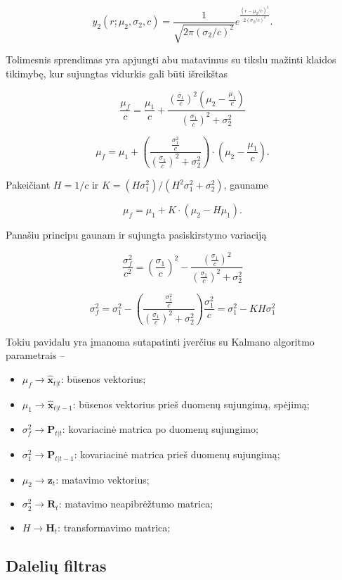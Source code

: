     \begin{equation}
        y_2(r; \mu_2, \sigma_2, c) = \frac{1}{\sqrt{2\pi (\sigma_2/c)^2}} e^{\frac{(r-\mu_2/c)^2}{2 (\sigma_2/c)^2}}.
    \end{equation}

    Tolimesnis sprendimas yra apjungti abu matavimus su tikslu mažinti klaidos tikimybę, kur sujungtas vidurkis gali būti išreikštas
    
    \begin{equation}
        \frac{\mu_f}{c} = \frac{\mu_1}{c} + \frac{ (\frac{\sigma_1}{c})^2 (\mu_2 - \frac{\mu_1}{c}) }{(\frac{\sigma_1}{c})^2 + \sigma_2^2}
    \end{equation}

    \begin{equation}
        \mu_f = \mu_1 + \left( \frac{ \frac{\sigma_1^2}{c} }{ ( \frac{\sigma_1}{c} )^2 + \sigma_2^2 } \right) \cdot 
        \left( \mu_2 - \frac{\mu_1}{c} \right).
    \end{equation}
    
    Pakeičiant $H = 1/c$ ir $K = ( H\sigma_1^2 )/(H^2\sigma_1^2 + \sigma_2^2)$, gauname

    \begin{equation}
        \mu_f = \mu_1 + K \cdot (\mu_2 - H\mu_1).
    \end{equation}

    Panašiu principu gaunam ir sujungta pasiskirstymo variaciją

    \begin{equation}
        \frac{\sigma_f^2}{c^2} = \left(\frac{\sigma_1}{c}\right)^2 - \frac{\left(\frac{\sigma_1}{c}\right)^2}{ \left( \frac{\sigma_1}{c} \right)^2 + \sigma_2^2 }
    \end{equation}
    
    \begin{equation}
        \sigma_f^2 = \sigma_1^2 - \left( \frac{ \frac{\sigma_1^2}{c} }{ \left( \frac{\sigma_1}{c} \right)^2 + \sigma_2^2 }  \right) \frac{\sigma_1^2}{c} = \sigma_1^2 - KH\sigma_1^2
    \end{equation}

    Tokiu pavidalu yra įmanoma sutapatinti įverčius su Kalmano algoritmo parametrais -- 
    \begin{itemize}
        \item $\mu_f \rightarrow \hat{\mathbf{x}}_{t|t}$: būsenos vektorius;
        \item $\mu_1 \rightarrow \hat{\mathbf{x}}_{t|t-1}$: būsenos vektorius prieš duomenų sujungimą, spėjimą;
        \item $\sigma_f^2 \rightarrow \mathbf{P}_{t|t}$: kovariacinė matrica po duomenų sujungimo;
        \item $\sigma_1^2 \rightarrow \mathbf{P}_{t|t-1}$: kovariacinė matrica prieš duomenų sujungimą;
        \item $\mu_2 \rightarrow \mathbf{z}_t$: matavimo vektorius;
        \item $\sigma_2^2 \rightarrow \mathbf{R}_t$: matavimo neapibrėžtumo matrica;
        \item $H \rightarrow \mathbf{H}_t$: transformavimo matrica;
    \end{itemize}
    
\subsection{Dalelių filtras}

